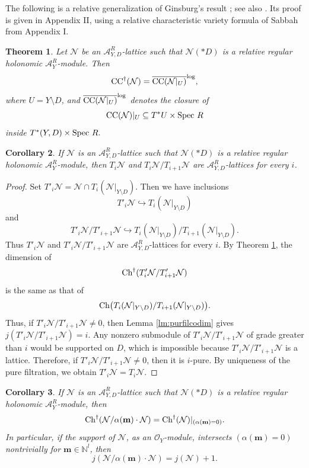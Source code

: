 \documentclass{amsart}
\theoremstyle{plain}
\newtheorem{theorem}{Theorem}
\numberwithin{theorem}{section}
\newtheorem{coro}[theorem]{Corollary}
\theoremstyle{definition}
\theoremstyle{remark}
\theoremstyle{definition}
\newcommand{\N}{\mathbb{N}}
\newcommand{\cN}{\mathcal{N}}
\newcommand{\cO}{\mathscr{O}}
\newcommand{\bm}{\mathbf{m}}
\newcommand{\sA}{\mathscr{A}}
\newcommand{\Spec}{\textup{Spec }}
\newcommand{\Ch}{\textup{Ch}}
\newcommand{\CC}{\textup{CC}}
\begin{document}
The following is a relative generalization of Ginsburg's result \cite[Thm.A1.2]{Gil1}; see also \cite[Thm.1.6]{Wuch}. Its proof is given in Appendix II, using a relative characteristic variety formula of Sabbah from Appendix I.

\begin{theorem}\label{thm:relGins-Sab}
Let $\cN$ be an $\sA^R_{Y,D}$-lattice such that $\cN(*D)$ is a relative regular holonomic $\sA_Y^R$-module. Then
\[
\CC^{\dagger}(\cN)=\overline{\CC(\cN|_{U})}^{\log},
\]
where $U=Y\setminus D$, and $\overline{\CC(\cN|_{U})}^{\log}$ denotes the closure of
\[
{\CC}(\cN)|_{U}\subseteq T^*U\times \Spec R
\]
inside
$T^*(Y,D)\times \Spec R.$
\end{theorem}

\begin{coro}\label{cor:purefillattice}
If $\cN$ is an $\sA_{Y,D}^R$-lattice such that $\cN(*D)$ is a relative regular holonomic $\sA_Y^R$-module, then $T_i\cN$ and $T_i\cN/T_{i+1}\cN$ are $\sA^R_{Y,D}$-lattices for every $i$.
\end{coro}

\begin{proof}
Set
$T'_i\cN=\cN\cap T_i(\cN|_{Y\setminus D}).$
Then we have inclusions
\[
T'_i\cN\hookrightarrow T_i(\cN|_{Y\setminus D})
\]
and
\[
T'_i\cN/T'_{i+1}\cN
\hookrightarrow
T_i(\cN|_{Y\setminus D})/T_{i+1}(\cN|_{Y\setminus D}).
\]
Thus $T'_i\cN$ and $T'_i\cN/T'_{i+1}\cN$ are $\sA^R_{Y,D}$-lattices for every $i$. By Theorem \ref{thm:relGins-Sab}, the dimension of
\[
\Ch^\dagger(T'_i\cN/T'_{i+1}\cN)
\]
is the same as that of
\[
\Ch\big(T_i(\cN|_{Y\setminus D})/T_{i+1}(\cN|_{Y\setminus D})\big).
\]
Thus, if $T'_i\cN/T'_{i+1}\cN\neq 0$, then Lemma \ref{lm:purfilcodim} gives
$j(T'_i\cN/T'_{i+1}\cN)=i.$
Any nonzero submodule of $T'_i\cN/T'_{i+1}\cN$ of grade greater than $i$ would be supported on $D$, which is impossible because $T'_i\cN/T'_{i+1}\cN$ is a lattice. Therefore, if $T'_i\cN/T'_{i+1}\cN\neq 0$, then it is $i$-pure. By uniqueness of the pure filtration, we obtain
$T'_i\cN=T_i\cN.$
\end{proof}

\begin{coro}\label{cor:puregradequot}
If $\cN$ is an $\sA_{Y,D}^R$-lattice such that $\cN(*D)$ is a relative regular holonomic $\sA_Y^R$-module, then
\[
\Ch^\dagger(\cN/\alpha(\bm)\cdot\cN)
=
\Ch^\dagger(\cN)|_{(\alpha(\bm)=0)}.
\]
In particular, if the support of $\cN$, as an $\cO_Y$-module, intersects $(\alpha(\bm)=0)$ nontrivially for $\bm\in \N^l$, then
\[
j(\cN/\alpha(\bm)\cdot\cN)=j(\cN)+1.
\]
\end{coro}
\end{document}
